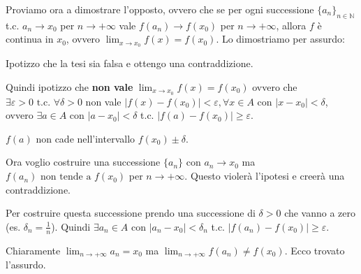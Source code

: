 Proviamo ora a dimostrare l'opposto, ovvero che se per ogni successione $\{a_n\}_{n\in\mathbb{N}}$ t.c. $a_n\to x_0$ per $n\to+\infty$ vale $f(a_n)\rightarrow f(x_0)$ per $n\to+\infty$, allora $f$ è continua in $x_0$, ovvero $\lim_{x\to x_0}f(x)=f(x_0)$.
Lo dimostriamo per assurdo:
\begin{dimostration}
    Ipotizzo che la tesi sia falsa e ottengo una contraddizione.
    
    Quindi ipotizzo che \textbf{non vale} $\lim_{x\to x_0}f(x)=f(x_0)$ ovvero che $\exists\varepsilon>0\text{ t.c. }\forall\delta>0$ non vale $|f(x)-f(x_0)|<\varepsilon, \forall x\in A$ con $|x-x_0|<\delta$, ovvero $\exists a\in A$ con $|a-x_0|<\delta$ t.c. $|f(a)-f(x_0)|\geq\varepsilon$.
    
\begin{center}
    
    $f(a)$ non cade nell'intervallo $f(x_0)\pm\delta$.
\end{center}
    
    Ora voglio costruire una successione $\{a_n\}$ con $a_n\to x_0$ ma $f(a_n)\text{ non tende a }f(x_0)$ per $n\to+\infty$. Questo violerà l'ipotesi e creerà una contraddizione.
    
    Per costruire questa successione prendo una successione di $\delta>0$ che vanno a zero (es. $\delta_n=\frac{1}{n}$). Quindi $\exists a_n\in A$ con $|a_n-x_0|<\delta_n$ t.c. $|f(a_n)-f(x_0)|\geq\varepsilon$.
    
    Chiaramente $\lim_{n\to+\infty}a_n=x_0$ ma $\lim_{n\to+\infty}f(a_n)\neq f(x_0)$. Ecco trovato l'assurdo.
\end{dimostration}

